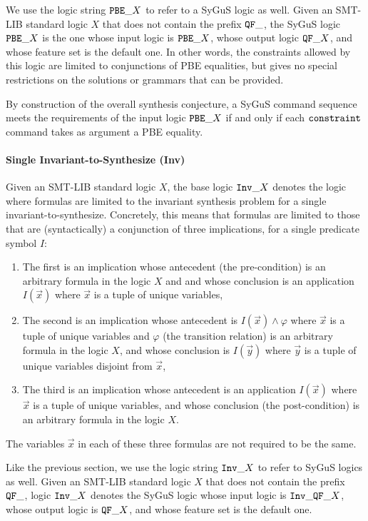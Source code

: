 \documentclass[english,a4paper,10pt]{article}
\begin{document}
We use the logic string ${\tt PBE\_}X$ to refer to a SyGuS logic as well.
Given an SMT-LIB standard logic $X$
that does not contain the prefix ${\tt QF\_}$,
the SyGuS logic ${\tt PBE\_}X$ is the one
whose input logic is ${\tt PBE\_}X$,
whose output logic ${\tt QF\_}X$,
and whose feature set is the default one.
In other words, the constraints allowed by this logic
are limited to conjunctions of PBE equalities,
but gives no special restrictions
on the solutions or grammars that can be provided.

By construction of the overall synthesis conjecture, a SyGuS command sequence
meets the requirements of the input logic ${\tt PBE\_}X$
if and only if each ${\tt constraint}$ command takes as argument a PBE equality.

\paragraph{Single Invariant-to-Synthesize (Inv)}
Given an SMT-LIB standard logic $X$,
the base logic ${\tt Inv\_}X$ denotes the logic
where formulas are limited to the invariant synthesis
problem for a single invariant-to-synthesize.
Concretely,
this means that formulas are limited to those that 
are (syntactically) a conjunction of three implications, 
for a single predicate symbol $I$:
\begin{enumerate}
\item The first is an implication whose antecedent (the pre-condition) 
is an arbitrary formula
in the logic $X$ and
and whose conclusion is
an application $I( \vec x )$ where $\vec x$ is a tuple of unique variables,

\item The second is an implication whose antecedent is
$I( \vec x ) \wedge \varphi$
where $\vec x$ is a tuple of unique variables and $\varphi$ (the transition relation) 
is an arbitrary formula
in the logic $X$,
and whose conclusion is $I( \vec y )$
where $\vec y$ is a tuple of unique variables disjoint from $\vec x$,

\item The third is an implication whose antecedent is 
an application $I( \vec x )$ where $\vec x$ is a tuple of unique variables,
and whose conclusion (the post-condition) is an arbitrary formula in the logic $X$.
\end{enumerate}
The variables $\vec x$ in each of these three formulas are not required to be the same.

Like the previous section, 
we use the logic string ${\tt Inv\_}X$ to refer to SyGuS logics as well.
Given an SMT-LIB standard logic $X$
that does not contain the prefix ${\tt QF\_}$,
logic ${\tt Inv\_}X$ denotes the SyGuS logic
whose input logic is ${\tt Inv\_QF\_}X$,
whose output logic is ${\tt QF\_}X$,
and whose feature set is the default one.
\end{document}
